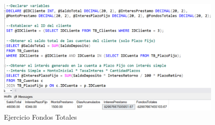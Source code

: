 \begin{figure}[H]
  \centering
  \includegraphics[scale = 0.5]{Imagenes/SQL/5.Ejercicios/fondos_totales.png}
  \caption{Ejercicio Fondos Totales}
\end{figure}